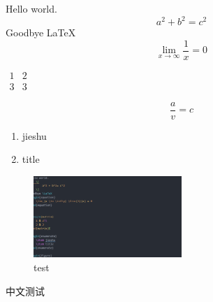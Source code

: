 \documentclass{article}
\begin{document}
\centering
Hello world.
    \[
        a^2 + b^2= c^2
    \]
Goodbye \LaTeX
\begin{equation}
    \lim_{x \to \infty} \frac{1}{x} = 0 
\end{equation}


$\begin{matrix}
    1 & 2\\
    3 & 3
\end{matrix}$

\begin{equation}
    \frac{a}{v}=c
\end{equation}

\begin{enumerate}
    \item jieshu
    \item title
\end{enumerate}

\begin{figure}[h]
    \centering
    \includegraphics[width=0.5\textwidth]{2020-06-05-23-30-16.png}
    \caption{test}
\end{figure}

中文测试
\end{document}
